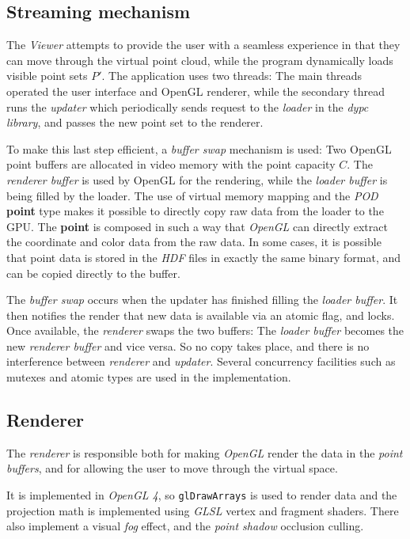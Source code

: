\documentclass[a4paper,10pt,abstracton,notitlepage]{scrreprt}
\begin{document}
\subsection{Streaming mechanism}
The \emph{Viewer} attempts to provide the user with a seamless experience in that they can move through the virtual point cloud, while the program dynamically loads visible point sets $P'$. The application uses two threads: The main threads operated the user interface and OpenGL renderer, while the secondary thread runs the \emph{updater} which periodically sends request to the \emph{loader} in the \emph{dypc library}, and passes the new point set to the renderer.

To make this last step efficient, a \emph{buffer swap} mechanism is used: Two OpenGL point buffers are allocated in video memory with the point capacity $C$. The \emph{renderer buffer} is used by OpenGL for the rendering, while the \emph{loader buffer} is being filled by the loader. The use of virtual memory mapping and the \emph{POD} \textbf{point} type makes it possible to directly copy raw data from the loader to the GPU. The \textbf{point} is composed in such a way that \emph{OpenGL} can directly extract the coordinate and color data from the raw data. In some cases, it is possible that point data is stored in the \emph{HDF} files in exactly the same binary format, and can be copied directly to the buffer.

The \emph{buffer swap} occurs when the updater has finished filling the \emph{loader buffer}. It then notifies the render that new data is available via an atomic flag, and locks. Once available, the \emph{renderer} swaps the two buffers: The \emph{loader buffer} becomes the new \emph{renderer buffer} and vice versa. So no copy takes place, and there is no interference between \emph{renderer} and \emph{updater}. Several concurrency facilities such as mutexes and atomic types are used in the implementation.

\subsection{Renderer}
The \emph{renderer} is responsible both for making \emph{OpenGL} render the data in the \emph{point buffers}, and for allowing the user to move through the virtual space.

It is implemented in \emph{OpenGL 4}, so \texttt{glDrawArrays} is used to render data and the projection math is implemented using \emph{GLSL} vertex and fragment shaders. There also implement a visual \emph{fog} effect, and the \emph{point shadow} occlusion culling.
\end{document}

